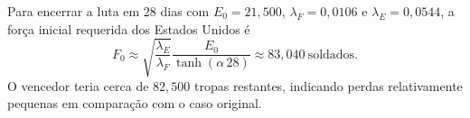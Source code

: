 Para encerrar a luta em 28 dias com $E_{0}=21{,}500$, $\lambda_{F}=0{,}0106$ e $\lambda_{E}=0{,}0544$, a força inicial requerida dos Estados Unidos é
\[
F_{0}\approx\sqrt{\frac{\lambda_{E}}{\lambda_{F}}}\frac{E_{0}}{\tanh(\alpha\,28)}\approx83{,}040\ \text{soldados}.
\]
O vencedor teria cerca de $82{,}500$ tropas restantes, indicando perdas relativamente pequenas em comparação com o caso original. 